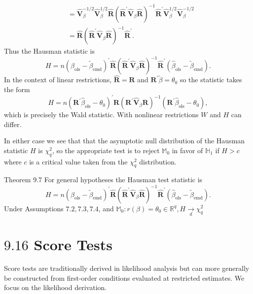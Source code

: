\documentclass[10pt]{article}
\begin{document}
$$
\begin{aligned}
& =\widehat{\boldsymbol{V}}_{\beta}^{-1 / 2} \widehat{\boldsymbol{V}}_{\beta}^{1 / 2} \widehat{\boldsymbol{R}}\left(\widehat{\boldsymbol{R}}^{\prime} \widehat{\boldsymbol{V}}_{\beta} \widehat{\boldsymbol{R}}\right)^{-1} \widehat{\boldsymbol{R}}^{\prime} \widehat{\boldsymbol{V}}_{\beta}^{1 / 2} \widehat{\boldsymbol{V}}_{\beta}^{-1 / 2} \\
& =\widehat{\boldsymbol{R}}\left(\widehat{\boldsymbol{R}}^{\prime} \widehat{\boldsymbol{V}}_{\beta} \widehat{\boldsymbol{R}}\right)^{-1} \widehat{\boldsymbol{R}}^{\prime} .
\end{aligned}
$$
Thus the Hausman statistic is
$$
H=n\left(\widehat{\beta}_{\mathrm{ols}}-\widetilde{\beta}_{\mathrm{emd}}\right)^{\prime} \widehat{\boldsymbol{R}}\left(\widehat{\boldsymbol{R}}^{\prime} \widehat{\boldsymbol{V}}_{\beta} \widehat{\boldsymbol{R}}\right)^{-1} \widehat{\boldsymbol{R}}^{\prime}\left(\widehat{\beta}_{\mathrm{ols}}-\widetilde{\beta}_{\mathrm{emd}}\right) .
$$
In the context of linear restrictions, $\widehat{\boldsymbol{R}}=\boldsymbol{R}$ and $\boldsymbol{R}^{\prime} \widetilde{\beta}=\theta_{0}$ so the statistic takes the form
$$
H=n\left(\boldsymbol{R}^{\prime} \widehat{\beta}_{\mathrm{ols}}-\theta_{0}\right)^{\prime} \widehat{\boldsymbol{R}}\left(\boldsymbol{R}^{\prime} \widehat{\boldsymbol{V}}_{\beta} \boldsymbol{R}\right)^{-1}\left(\boldsymbol{R}^{\prime} \widehat{\beta}_{\mathrm{ols}}-\theta_{0}\right),
$$
which is precisely the Wald statistic. With nonlinear restrictions $W$ and $H$ can differ.

In either case we see that that the asymptotic null distribution of the Hausman statistic $H$ is $\chi_{q}^{2}$, so the appropriate test is to reject $\mathbb{M}_{0}$ in favor of $\mathbb{H}_{1}$ if $H>c$ where $c$ is a critical value taken from the $\chi_{q}^{2}$ distribution.

Theorem 9.7 For general hypotheses the Hausman test statistic is
$$
H=n\left(\widehat{\beta}_{\mathrm{ols}}-\widetilde{\beta}_{\mathrm{emd}}\right)^{\prime} \widehat{\boldsymbol{R}}\left(\widehat{\boldsymbol{R}}^{\prime} \widehat{\boldsymbol{V}}_{\beta} \widehat{\boldsymbol{R}}\right)^{-1} \widehat{\boldsymbol{R}}^{\prime}\left(\widehat{\beta}_{\mathrm{ols}}-\widetilde{\beta}_{\mathrm{emd}}\right) .
$$
Under Assumptions $7.2,7.3,7.4$, and $\mathbb{M}_{0}: r(\beta)=\theta_{0} \in \mathbb{R}^{q}, H \underset{d}{\longrightarrow} \chi_{q}^{2}$

\section{$9.16$ Score Tests}
Score tests are traditionally derived in likelihood analysis but can more generally be constructed from first-order conditions evaluated at restricted estimates. We focus on the likelihood derivation.
\end{document}
